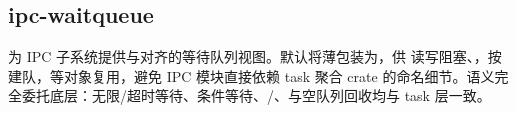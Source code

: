 
\subsection{ipc-waitqueue}

为 IPC 子系统提供与对齐的等待队列视图。默认将薄包装为，供 读写阻塞、，按  建队，等对象复用，避免 IPC 模块直接依赖 task 聚合 crate 的命名细节。语义完全委托底层：无限/超时等待、条件等待、/、与空队列回收均与 task 层一致。




